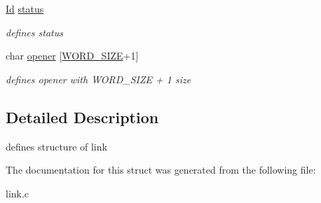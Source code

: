 \begin{DoxyCompactItemize}
\mbox{\label{struct__Link_a77ce1098e94225bb67c9ea96485de5f7}} 
\hyperlink{types_8h_a845e604fb28f7e3d97549da3448149d3}{Id} \hyperlink{struct__Link_a77ce1098e94225bb67c9ea96485de5f7}{status}
\begin{DoxyCompactList}\small\item\em defines status \end{DoxyCompactList}\item 
\mbox{\label{struct__Link_a5711b3e0039cb83f5ebeea3ae742b787}} 
char \hyperlink{struct__Link_a5711b3e0039cb83f5ebeea3ae742b787}{opener} \mbox{[}\hyperlink{types_8h_a92ed8507d1cd2331ad09275c5c4c1c89}{W\+O\+R\+D\+\_\+\+S\+I\+ZE}+1\mbox{]}
\begin{DoxyCompactList}\small\item\em defines opener with W\+O\+R\+D\+\_\+\+S\+I\+ZE + 1 size \end{DoxyCompactList}\end{DoxyCompactItemize}


\subsection{Detailed Description}
defines structure of link 

The documentation for this struct was generated from the following file\+:\begin{DoxyCompactItemize}
\item 
link.\+c\end{DoxyCompactItemize}

